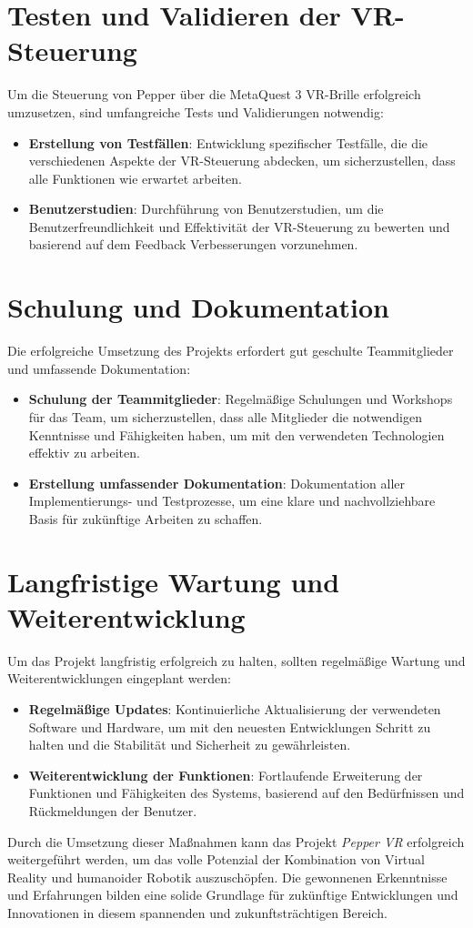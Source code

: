 \section{Testen und Validieren der VR-Steuerung}
Um die Steuerung von Pepper über die MetaQuest 3 VR-Brille erfolgreich umzusetzen, sind umfangreiche Tests und Validierungen notwendig:
\begin{itemize}
    \item \textbf{Erstellung von Testfällen}: Entwicklung spezifischer Testfälle, die die verschiedenen Aspekte der VR-Steuerung abdecken, um sicherzustellen, dass alle Funktionen wie erwartet arbeiten.
    \item \textbf{Benutzerstudien}: Durchführung von Benutzerstudien, um die Benutzerfreundlichkeit und Effektivität der VR-Steuerung zu bewerten und basierend auf dem Feedback Verbesserungen vorzunehmen.
\end{itemize}

\section{Schulung und Dokumentation}
Die erfolgreiche Umsetzung des Projekts erfordert gut geschulte Teammitglieder und umfassende Dokumentation:
\begin{itemize}
    \item \textbf{Schulung der Teammitglieder}: Regelmäßige Schulungen und Workshops für das Team, um sicherzustellen, dass alle Mitglieder die notwendigen Kenntnisse und Fähigkeiten haben, um mit den verwendeten Technologien effektiv zu arbeiten.
    \item \textbf{Erstellung umfassender Dokumentation}: Dokumentation aller Implementierungs- und Testprozesse, um eine klare und nachvollziehbare Basis für zukünftige Arbeiten zu schaffen.
\end{itemize}

\section{Langfristige Wartung und Weiterentwicklung}
Um das Projekt langfristig erfolgreich zu halten, sollten regelmäßige Wartung und Weiterentwicklungen eingeplant werden:
\begin{itemize}
    \item \textbf{Regelmäßige Updates}: Kontinuierliche Aktualisierung der verwendeten Software und Hardware, um mit den neuesten Entwicklungen Schritt zu halten und die Stabilität und Sicherheit zu gewährleisten.
    \item \textbf{Weiterentwicklung der Funktionen}: Fortlaufende Erweiterung der Funktionen und Fähigkeiten des Systems, basierend auf den Bedürfnissen und Rückmeldungen der Benutzer.
\end{itemize}

Durch die Umsetzung dieser Maßnahmen kann das Projekt \textit{Pepper VR} erfolgreich weitergeführt werden, um das volle Potenzial der Kombination von Virtual Reality und humanoider Robotik auszuschöpfen. Die gewonnenen Erkenntnisse und Erfahrungen bilden eine solide Grundlage für zukünftige Entwicklungen und Innovationen in diesem spannenden und zukunftsträchtigen Bereich.

